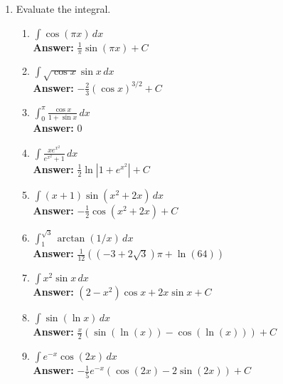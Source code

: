 \documentclass[letterpaper]{article}
\begin{document}
\begin{enumerate}

\item Evaluate the integral.
	\begin{enumerate}

	\item $\displaystyle\int \cos (\pi x) \,dx$
	\\ \textbf{Answer:} $\frac1\pi \sin(\pi x) +C$

	\item $\int \sqrt{\cos x}\sin x\, dx$
	\\ \textbf{Answer:} $-\frac23 (\cos x)^{3/2}+C$

	\item $\int_0^\pi \frac{\cos x}{1+\sin x}\,dx$ 
	\\ \textbf{Answer:} $0$

	\item $\displaystyle\int \frac{x e^{x^2}}{e^{x^2}+1}\, dx$
	\\ \textbf{Answer:} $\frac12 \ln\left|1+e^{x^2}\right|+C$

	\item $\displaystyle\int (x+1) \sin(x^2+2x)\, dx$
	\\ \textbf{Answer:} $-\frac12 \cos(x^2+2x)+C$

	\item $\displaystyle\int_1^{\sqrt{3}} \arctan(1/x)\,dx$
	\\ \textbf{Answer:} $\frac{1}{12} \left(\left(-3+2 \sqrt{3}\right) \pi +\ln(64)\right)$

	\item $\displaystyle\int x^2\sin x\,dx$
	\\ \textbf{Answer:} $(2-x^2)\cos x + 2x\sin x +C$

	\item $\displaystyle\int \sin(\ln x)\, dx$
	\\ \textbf{Answer:} $\frac x2 \left(\sin(\ln(x))-\cos(\ln(x))\right)+C$

	\item $\displaystyle\int e^{-x} \cos(2x)\, dx$
	\\ \textbf{Answer:} $-\frac15 e^{-x}(\cos (2x)-2\sin(2x))+C$


\end{enumerate}
\end{enumerate}
\end{document}
